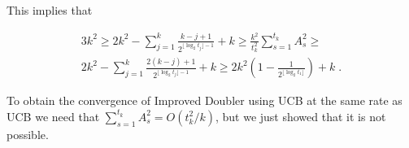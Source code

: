 \documentclass{article}
\numberwithin{equation}{section}
\theoremstyle{plain}
\theoremstyle{plain}
\theoremstyle{plain}
\theoremstyle{remark}
\theoremstyle{remark}
\newcommand{\1}{\ensuremath{\mathbbm{1}}}
\newcommand{\E}{\mathbb{E}}
\newcommand{\PP}{\mathbb{P}}
\begin{document}
This implies that 

\begin{multline*}
3k^{2} \geq 2k^{2}-\sum\limits_{j=1}^{k}\frac{k-j+1}{2^{\lfloor\log_{2} t_{j}\rfloor-1}}+k \geq \frac{k^{2}}{t_{k}^{2}}\sum\limits_{s=1}^{t_{k}}A_{s}^{2}\geq  \\  2k^{2}-\sum\limits_{j=1}^{k}\frac{2(k-j)+1}{2^{\lfloor\log_{2} t_{j}\rfloor-1}}+k \geq 2k^{2}\left(1-\frac{1}{2^{\lfloor\log_{2} t_{1}\rfloor}}\right)+k \;.
\end{multline*}

To obtain the convergence of Improved Doubler using UCB at the same rate as UCB we need that $\sum_{s=1}^{t_{k}}A_{s}^{2}=O(t_{k}^{2}/k)$, but we just showed that it is not possible. 

%




\end{document}
